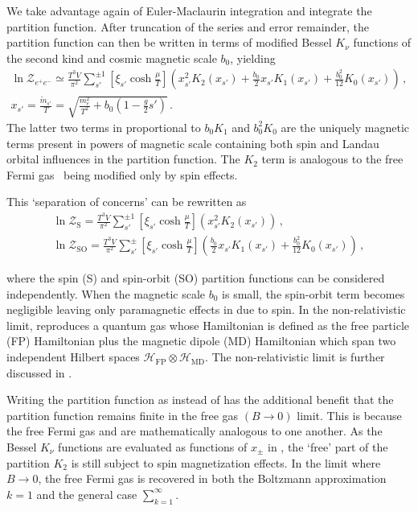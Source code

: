We take advantage again of Euler-Maclaurin integration  and integrate the partition function. After truncation of the series and error remainder, the partition function  can then be written in terms of modified Bessel $K_{\nu}$ functions of the second kind and cosmic magnetic scale $b_{0}$, yielding
\begin{gather}
    \label{boltzmann}
    \boxed{\ln\mathcal{Z}_{e^{+}e^{-}}\simeq\frac{T^{3}V}{\pi^{2}}\sum_{s'}^{\pm1}\left[\xi_{s'}\cosh{\frac{\mu}{T}}\right]
    \left(x_{s'}^{2}K_{2}(x_{s'})+\frac{b_{0}}{2}x_{s'}K_{1}(x_{s'})+\frac{b_{0}^{2}}{12}K_{0}(x_{s'})\right)}\,,\\
    \label{xfunc}
    x_{s'}=\frac{{\tilde m}_{s'}}{T}=\sqrt{\frac{m_{e}^{2}}{T^{2}}+b_{0}\left(1-\frac{g}{2}s'\right)}\,.
\end{gather}
The latter two terms in  proportional to $b_{0}K_{1}$ and $b_{0}^{2}K_{0}$ are the uniquely magnetic terms present in powers of magnetic scale  containing both spin and Landau orbital influences in the partition function. The $K_{2}$ term is analogous to the free Fermi gas~\cite{greiner2012thermodynamics} being modified only by spin effects.

This `separation of concerns' can be rewritten as
\begin{gather}
    \label{spin}
    \ln\mathcal{Z}_\mathrm{S}=\frac{T^{3}V}{\pi^{2}}\sum_{s'}^{\pm1}\left[\xi_{s'}\cosh{\frac{\mu}{T}}\right]\left(x_{s'}^{2}K_{2}(x_{s'})\right)\,,\\
    \label{spinorbit}
    \ln\mathcal{Z}_\mathrm{SO}=\frac{T^{3}V}{\pi^{2}}\sum_{s'}^{\pm}\left[\xi_{s'}\cosh{\frac{\mu}{T}}\right]
    \left(\frac{b_{0}}{2}x_{s'}K_{1}(x_{s'})+\frac{b_{0}^{2}}{12}K_{0}(x_{s'})\right)\,,        
\end{gather}

where the spin (S) and spin-orbit (SO) partition functions can be considered independently. When the magnetic scale $b_{0}$ is small, the spin-orbit term  becomes negligible leaving only paramagnetic effects in  due to spin. In the non-relativistic limit,  reproduces a quantum gas whose Hamiltonian is defined as the free particle (FP) Hamiltonian plus the magnetic dipole (MD) Hamiltonian which span two independent Hilbert spaces $\mathcal{H}_\mathrm{FP}\otimes\mathcal{H}_\mathrm{MD}$. The non-relativistic limit is further discussed in .

Writing the partition function as  instead of  has the additional benefit that the partition function remains finite in the free gas $({B}\rightarrow0)$ limit. This is because the free Fermi gas and  are mathematically analogous to one another. As the Bessel $K_{\nu}$ functions are evaluated as functions of $x_{\pm}$ in , the `free' part of the partition $K_{2}$ is still subject to spin magnetization effects. In the limit where ${B}\rightarrow0$, the free Fermi gas is recovered in both the Boltzmann approximation $k=1$ and the general case $\sum_{k=1}^{\infty}$.

